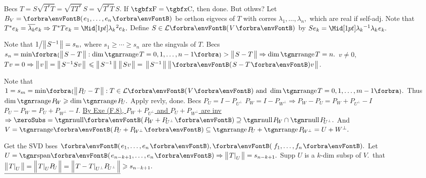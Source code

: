 Becs $T=S\sqrt{T^*T}=\sqrt{TT^*}\,S=\sqrt{T^*T}\,S.$ \;If $\Fbb=\Cbb,$ then done. But othws\:?\parSol{}
Let $B_V=\Par{e_1,\dots,e_n}$ be orthon eigvecs of $T$ with corres $\lambda_1,\dots,\lambda_n,$ which are real if self-adj.\parSol{}
Note that $T^*e_k=\overline{\lambda_k}e_k\Rightarrow T^*Te_k=\aMidsq{\lambda_k}e_k.$ \;Define $S\in\Lm{V}$ by $Se_k=\aMid{\lambda_k}{^{-1}}\lambda_k\:\!e_k.$\PfEnd
\SepLine

Note that $1\big/\big\Vert\hspace{1pt}{}S^{-1}{}\hspace{1pt}\big\Vert=s_n,$ where $s_1\geqslant\cdots\geqslant s_n$ are the singvals of $T.$\parSol{}
Becs $s_n=\min\!\Bra{\Dvert{S-T}:\dim\range T=0,1,\dots,n-1}>\Dvert{S-T}\Rightarrow\dim\range T=n.$\PfEnd\vspace{2pt}\parSol{}
\Or $v\neq0,{}$\uline{$Tv=0\Rightarrow\big\Vert\hspace{1pt}{}v{}\hspace{1pt}\big\Vert=\big\Vert\hspace{1pt}{}S^{-1}Sv{}\hspace{1pt}\big\Vert$}${}\leqslant\big\Vert\hspace{1pt}{}S^{-1}{}\hspace{1pt}\big\Vert\:\big\Vert\hspace{1pt}{}Sv{}\hspace{1pt}\big\Vert={}$\uline{$\Dvert{S^{-1}}\:\Dvert{\Par{S-T}v}$}.\PfEnd
\SepLine

Note that $1=s_m=\min\!\Bra{\Dvert{P_{\!U}-T}:T\in\Lm{V}\text{ and }\dim\range T=0,1,\dots,m-1}.$\parSol{}
Thus $\dim\range P_{\!W}\geqslant\dim\range P_{\!U}.$ \;Apply revly, done.\PfEnd\vspace{2pt}\parSol{}
\Or Becs $P_{\!U}=I-P_{\!U^\perp}$ \OR $P_{\!W}=I-P_{\!W^\perp}\Rightarrow P_{\!W}-P_{\!U}=P_{\!W}+P_{\!U^\perp}-I$\, \OR \,$P_{\!U}-P_{\!W}=P_{\!U}+P_{\!W^\perp}-I.$\parSol{}
\uline{By Exe (F.8), $P_{\!W}+P_{\!U^\perp}$ and $P_{\!U}+P_{\!W^\perp}$ are inv} $\Rightarrow\zeroSubs=\Null\Par{P_{\!W}+P_{\!U^\perp}}\supseteq\null P_{\!W}\cap\null P_{\!U^\perp}.$\parSol{}
And $V=\Range\Par{P_{\!U}+P_{\!W^\perp}}\subseteq\range P_{\!U}+\range P_{\!W^\perp}=U+W^\perp.$\PfEnd
\SepLine

Get the SVD bses $\Par{e_1,\dots,e_n},\Par{\,f_1,\dots,f_n}.$ Let $U=\Span{e_{n-k+1},\dots,e_n}\Rightarrow\Dvert{T\mmid_U}=s_{n-k+1}.$\vspace{1pt}\parSol{}
Supp $U$ is a $k$\hspace{1pt}-\hspace{1pt}dim subsp of $V.$ \,\NOTICE that $\uline{\Dvert{T\mmid_U}=\BigDvert{T\mmid_UP_{\!U}}=\BigDvert{T-T\mmid_{U^\perp}P_{\!U^\perp}}}\geqslant s_{n-k+1}.$\PfEnd
\SepLine\pagebreak

